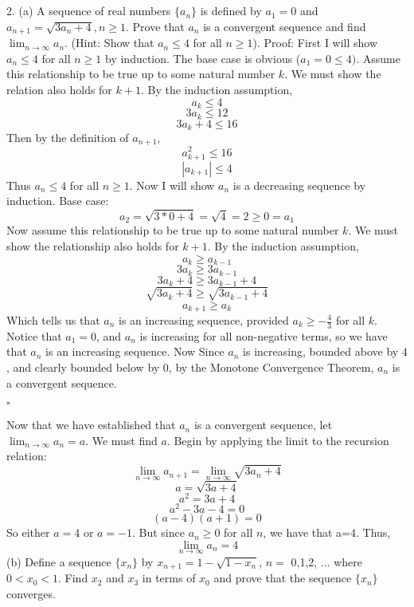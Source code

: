 \documentclass{article}
\begin{document}
\section{}
2. (a) A sequence of real numbers $\{a_n\}$ is defined by $a_1 = 0$ and $a_{n+1} = \sqrt{3a_n+4}, n \geq 1$. Prove that ${a_n}$ is a convergent sequence and find $\lim_{n \to \infty} a_n$. (Hint: Show that $a_n \leq 4 $ for all $n \geq 1$).
\newline\newline
Proof: First I will show $a_n \leq 4$ for all $n \geq 1$ by induction. The base case is obvious ($a_1 = 0 \leq 4)$. Assume this relationship to be true up to some natural number $k$. We must show the relation also holds for $k+1$.
\newline
By the induction assumption,
\[a_k \leq 4\]
\[3a_k \leq 12\]
\[3a_k+4 \leq 16\]
Then by the definition of $a_{n+1}$,
\[a_{k+1}^2 \leq 16\]
\[|a_{k+1}| \leq 4\]
Thus $a_n \leq 4$ for all $n \geq 1$.
\newline
Now I will show ${a_n}$ is a decreasing sequence by induction.
\newline
Base case:
\[a_2 = \sqrt{3*0+4} = \sqrt{4} = 2 \geq 0 = a_1\]
Now assume this relationship to be true up to some natural number $k$. We must show the relationship also holds for $k+1$. By the induction assumption, 
\[a_k \geq a_{k-1}\]
\[3a_k \geq 3a_{k-1}\]
\[3a_k + 4 \geq 3a_{k-1} + 4\]
\[\sqrt{3a_k+4} \geq \sqrt{3a_{k-1}+4}\]
\[a_{k+1} \geq a_k\]
Which tells us that ${a_n}$ is an increasing sequence, provided $a_k \geq -\frac{4}{3}$ for all $k$. 
\newline
Notice that $a_1 = 0$, and ${a_n}$ is increasing for all non-negative terms, so we have that ${a_n}$ is an increasing sequence. Now Since ${a_n}$ is increasing, bounded above by $4$, and clearly bounded below by $0$, by the Monotone Convergence Theorem, ${a_n}$ is a convergent sequence. 
\begin{flushright}
    $\square$
\end{flushright}
Now that we have established that ${a_n}$ is a convergent sequence, let $\lim_{n \to \infty} a_n = a$. We must find $a$. Begin by applying the limit to the recursion relation:
\[\lim_{n \to \infty}a_{n+1} = \lim_{n \to \infty} \sqrt{3a_n+4}\]
\[a = \sqrt{3a+4}\]
\[a^2 = 3a+4\]
\[a^2-3a-4 = 0\]
\[(a-4)(a+1) = 0\]
So either $a = 4$ or $a = -1$. But since $a_n \geq 0$ for all $n$, we have that a=4. Thus, 
\[\lim_{n \to \infty} a_n = 4\]
(b) Define a sequence $\{x_n\}$ by $x_{n+1} = 1 - \sqrt{1-x_n}$, $n =$ 0,1,2, ... where $0 < x_0 < 1$. Find $x_2$ and $x_3$ in terms of $x_0$ and prove that the sequence $\{x_n\}$ converges.
\end{document}
